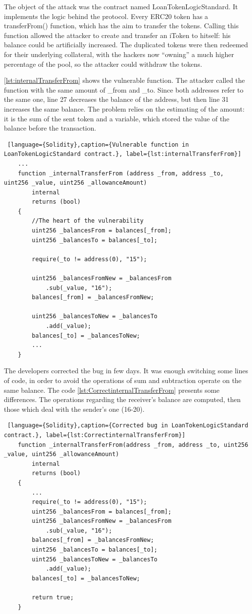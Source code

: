 The object of the attack was the contract named LoanTokenLogicStandard.
It implements the logic behind the protocol.
Every ERC20 token has a transferFrom() function, which has the aim to transfer the tokens.
Calling this function allowed the attacker to create and transfer an iToken to hitself: his balance could be artificially increased.
The duplicated tokens were then redeemed for their underlying collateral, 
with the hackers now “owning” a much higher percentage of the pool, so the attacker could withdraw the tokens.

\autoref{lst:internalTransferFrom} shows the vulnerable function. 
The attacker called the function with the same amount of \_from and \_to. 
Since both addresses refer to the same one, line 27 decreases the balance of the address, but then line 31 increases the same balance. 
The problem relies on the estimating of the amount: it is the sum of the sent token and 
a variable, which stored the value of the balance before the transaction.

\begin{lstlisting} [language={Solidity},caption={Vulnerable function in LoanTokenLogicStandard contract.}, label={lst:internalTransferFrom}]
    ... 
    function _internalTransferFrom (address _from, address _to, uint256 _value, uint256 _allowanceAmount)
        internal
        returns (bool)
    {
        //The heart of the vulnerability 
        uint256 _balancesFrom = balances[_from];
        uint256 _balancesTo = balances[_to];

        require(_to != address(0), "15");

        uint256 _balancesFromNew = _balancesFrom
            .sub(_value, "16");
        balances[_from] = _balancesFromNew;

        uint256 _balancesToNew = _balancesTo
            .add(_value);
        balances[_to] = _balancesToNew;
        ...
    }
\end{lstlisting}

The developers corrected the bug in few days. 
It was enough switching some lines of code, in order to avoid the operations of sum and subtraction operate on the same balance. 
The code \autoref{lst:CorrectinternalTransferFrom} presents some differences. The operations regarding the receiver's balance are computed, then those which deal with the sender's one (16-20).
\begin{lstlisting} [language={Solidity},caption={Corrected bug in LoanTokenLogicStandard contract.}, label={lst:CorrectinternalTransferFrom}]
    function _internalTransferFrom(address _from, address _to, uint256 _value, uint256 _allowanceAmount)
        internal
        returns (bool)
    {
        ...
        require(_to != address(0), "15");
        uint256 _balancesFrom = balances[_from];
        uint256 _balancesFromNew = _balancesFrom
            .sub(_value, "16");
        balances[_from] = _balancesFromNew;
        uint256 _balancesTo = balances[_to];
        uint256 _balancesToNew = _balancesTo
            .add(_value);
        balances[_to] = _balancesToNew;
        
        return true;
    }   
\end{lstlisting}

